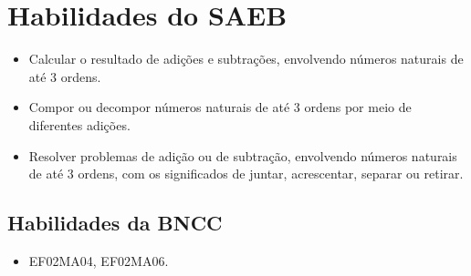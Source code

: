 
\section*{Habilidades do SAEB}

\begin{itemize}
\item Calcular o resultado de adições e subtrações, envolvendo números naturais de até 3 ordens.

\item Compor ou decompor números naturais de até 3 ordens por meio de diferentes adições.

\item Resolver problemas de adição ou de subtração, envolvendo números
naturais de até 3 ordens, com os significados de juntar, acrescentar, separar ou retirar.
\end{itemize}

\subsection{Habilidades da BNCC}

\begin{itemize}
\item EF02MA04, EF02MA06.
\end{itemize}


